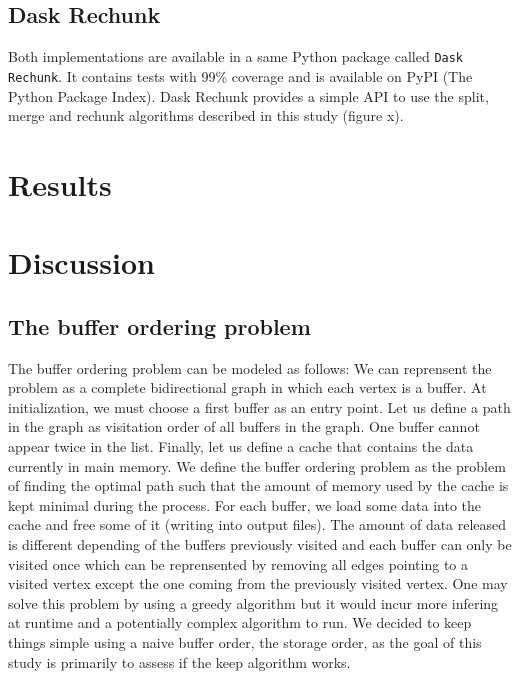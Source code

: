 \documentclass[conference]{IEEEtran}
\begin{document}
\subsection{Dask Rechunk}

Both implementations are available in a same Python package called \texttt{Dask Rechunk}. It
contains tests with 99\% coverage and is available on PyPI (The Python Package
Index). Dask Rechunk provides a simple API to use the split, merge and rechunk
algorithms described in this study (figure x).

\section{Results}

\section{Discussion}

\subsection{The buffer ordering problem}
The buffer ordering problem can be modeled as follows: We can reprensent the
problem as a complete bidirectional graph in which each vertex is a buffer. At
initialization, we must choose a first buffer as an entry point. Let us define
a path in the graph as visitation order of all buffers in the graph. One buffer
cannot appear twice in the list. Finally, let us define a cache that contains
the data currently in main memory. We define the buffer ordering problem as the
problem of finding the optimal path such that the amount of memory used by the
cache is kept minimal during the process. For each buffer, we load some data
into the cache and free some of it (writing into output files). The amount of
data released is different depending of the buffers previously visited and each
buffer can only be visited once which can be reprensented by removing all edges
pointing to a visited vertex except the one coming from the previously visited
vertex. One may solve this problem by using a greedy algorithm but it would
incur more infering at runtime and a potentially complex algorithm to run.
We decided to keep things simple using a naive buffer order, the storage order,
as the goal of this study is primarily to assess if the keep algorithm works.
\end{document}
